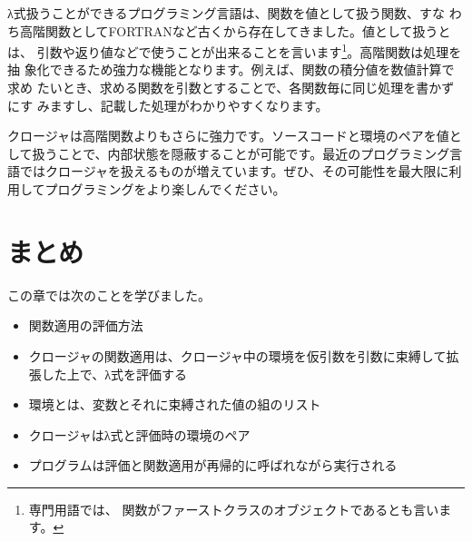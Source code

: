 λ式扱うことができるプログラミング言語は、関数を値として扱う関数、すな
わち高階関数としてFORTRANなど古くから存在してきました。値として扱うとは、
引数や返り値などで使うことが出来ることを言います\footnote{専門用語では、
関数がファーストクラスのオブジェクトであるとも言います。}。高階関数は処理を抽
象化できるため強力な機能となります。例えば、関数の積分値を数値計算で求め
たいとき、求める関数を引数とすることで、各関数毎に同じ処理を書かずにす
みますし、記載した処理がわかりやすくなります。

クロージャは高階関数よりもさらに強力です。ソースコードと環境のペアを値として扱うことで、内部状態を隠蔽することが可能です。最近のプログラミング言語ではクロージャを扱えるものが増えています。ぜひ、その可能性を最大限に利用してプログラミングをより楽しんでください。

\section{まとめ}

この章では次のことを学びました。

\begin{itemize}
\item 関数適用の評価方法
\item クロージャの関数適用は、クロージャ中の環境を仮引数を引数に束縛して拡張した上で、λ式を評価する
\item 環境とは、変数とそれに束縛された値の組のリスト
\item クロージャはλ式と評価時の環境のペア
\item プログラムは評価と関数適用が再帰的に呼ばれながら実行される
\end{itemize}


